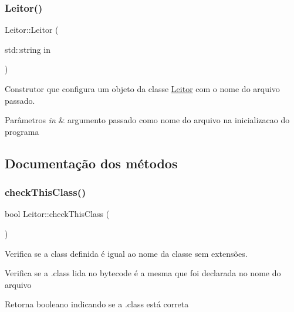 \subsubsection{\texorpdfstring{Leitor()}{Leitor()}\hspace{0.1cm}{\footnotesize\ttfamily [2/2]}}
{\footnotesize\ttfamily Leitor\+::\+Leitor (\begin{DoxyParamCaption}\item[{std\+::string}]{in }\end{DoxyParamCaption})}

Construtor que configura um objeto da classe \hyperlink{classLeitor}{Leitor} com o nome do arquivo passado.


\begin{DoxyParams}{Parâmetros}
{\em in} & argumento passado como nome do arquivo na inicializacao do programa \\
\hline
\end{DoxyParams}


\subsection{Documentação dos métodos}
\mbox{\label{classLeitor_a46501dcb0e924524b6354f5459503ce8}} 
\subsubsection{\texorpdfstring{check\+This\+Class()}{checkThisClass()}}
{\footnotesize\ttfamily bool Leitor\+::check\+This\+Class (\begin{DoxyParamCaption}{ }\end{DoxyParamCaption})}



Verifica se a class definida é igual ao nome da classe sem extensões. 

Verifica se a .class lida no bytecode é a mesma que foi declarada no nome do arquivo \begin{DoxyReturn}{Retorna}
booleano indicando se a .class está correta 
\end{DoxyReturn}
\mbox{\label{classLeitor_a568b259f176676472196ad0fb127c4f2}} 
